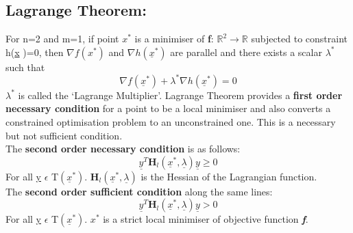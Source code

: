 \documentclass[12pt,a4paper,titlepage]{article}
\begin{document}
\subsection{Lagrange Theorem:}
For n=2 and m=1, if point $x^{*}$ is a minimiser of \textbf{f}: $\mathbb{R}^{2}\rightarrow\mathbb{R}$ subjected to constraint h(\underline{x} )=0, then $\nabla f (x^{*})$ and $\nabla h(\underline{x}^{*})$  are parallel and there exists a scalar $\lambda ^{*}$ such that
\begin{equation}
    \nabla f(\underline{x}^{*})+ \lambda^{*} \nabla h(\underline{x}^{*}) = 0
\end{equation}
$\lambda^{*}$ is called the `Lagrange Multiplier'. Lagrange Theorem provides a \textbf{first order necessary condition} for a point to be a local minimiser and also converts a constrained optimisation problem to an unconstrained one. This is a necessary but not sufficient condition.\\
The \textbf{second order necessary condition} is as follows:
\begin{equation}
    \underline{y}^{T}\textbf{H}_{l}(\underline{x}^{*}, \underline{\lambda})\underline{y} \geq 0 
\end{equation}
For all \underline{y} $\epsilon$ T$(\underline{x}^{*})$. $\textbf{H}_{l}(\underline{x}^{*}, \underline{\lambda})$ is the Hessian of the Lagrangian function.\\
The \textbf{second order sufficient condition} along the same lines:
\begin{equation}
    \underline{y}^{T}\textbf{H}_{l}(\underline{x}^{*}, \underline{\lambda})\underline{y} > 0 
\end{equation}
For all \underline{y} $\epsilon$ T$(\underline{x}^{*})$. $x^{*}$
is a strict local minimiser of objective function \textbf{\textit{f}}.
\end{document}
